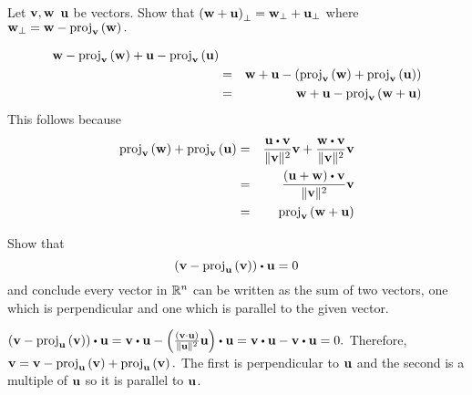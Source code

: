 \begin{enumialphparenastyle}
\begin{ex} \label{perplinear} Let ${\bf v},{\bf w}$ ${\bf u}$ be vectors. Show
that $\left( {\bf w}+{\bf u}\right) _{\perp }={\bf w}_{\perp }+{\bf u}_{\perp }$
 where ${\bf w}_{\perp }={\bf w}-\mbox{proj}_{{\bf v}}\left( {\bf w}\right) .$
\begin{sol}
\begin{eqnarray*}
{\bf w}-\mbox{proj}_{{\bf v}}\left({\bf w}\right) +{\bf u}- \mbox{proj}_{{\bf v}}\left( {\bf u}\right) \\
&=&{\bf w}+{\bf u}-\left( \mbox{proj}_{{\bf v}}\left( {\bf w}\right) +\mbox{proj}_{{\bf v}}\left( {\bf u}\right) \right) \\
&=&{\bf w}+{\bf u}-\mbox{proj}_{{\bf v}}\left( {\bf w}+{\bf u}\right) 
\end{eqnarray*}
This follows because 
\begin{eqnarray*}
\func{proj}_{\vect{v}}\left( \vect{w}\right) +\func{proj}_{\vect{v}}\left(
\vect{u}\right) &=& \frac{\vect{u}\dotprod \vect{v}}{\vectlength \vect{v}\vectlength ^{2}}\vect{v}+
\frac{\vect{w}\dotprod \vect{v}}{\vectlength \vect{v}\vectlength ^{2}}\vect{v} \\
&=& \frac{\left( \vect{u}+\vect{w}\right) \dotprod \vect{v}}{\vectlength \vect{v}
\vectlength ^{2}}\vect{v} \\
&=& \func{proj}_{\vect{v}}\left( \vect{w}+\vect{u}\right)
\end{eqnarray*}
\end{sol}
\end{ex}

\begin{ex} Show that
\begin{equation*}
 \left( \vect{v}-\func{proj}_{\vect{u}
}\left( \vect{v}\right) \right) \dotprod \vect{u}=0
\end{equation*}
and conclude every vector in $\mathbb{R}^{n}$ can be written as the sum of
two vectors, one which is perpendicular and one which is parallel to the
given vector.
\begin{sol}
$\left( \vect{v}-\func{proj}_{\vect{u}}\left( \vect{v}\right) \right) \dotprod \vect{u} =  \vect{v} \dotprod \vect{u} -\left( \frac{\left( \vect{v\cdot u}\right) }{\vectlength \vect{u} \vectlength ^{2}}\vect{u} \right) \dotprod \vect{u} = \vect{v} \dotprod \vect{u} - \vect{v} \dotprod \vect{u} =0.$ Therefore, ${\bf v} = {\bf v} - \mbox{proj}_{{\bf u}}\left( {\bf v}\right) + \mbox{proj}_{{\bf u}}\left( {\bf v}\right).$ The first is perpendicular to ${\bf u}$ and the second is a multiple
of ${\bf u}$ so it is parallel to ${\bf u}$.
\end{sol}
\end{ex}

\end{enumialphparenastyle}